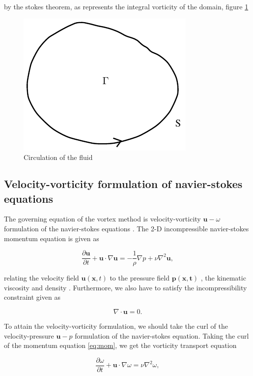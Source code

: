 by the stokes theorem, as represents the integral vorticity of the domain, figure \ref{fig:vorticityCirculation}

\begin{figure}[h]
\centering
\includegraphics[width=0.2\linewidth]{./figures/lagrangian/vorticityCirculation.pdf}
\caption{Circulation of the fluid}
\label{fig:vorticityCirculation}
\end{figure}

 
\subsection{Velocity-vorticity formulation of navier-stokes equations}
The governing equation of the vortex method is velocity-vorticity $\mathbf{u}-\omega$ formulation of the navier-stokes equations \cite{Cottet2000a}. The 2-D incompressible navier-stokes momentum equation is given as

\begin{equation}
\frac{\partial \mathbf{u}}{\partial t} + \mathbf{u}\cdot\nabla\mathbf{u} = - \frac{1}{\rho} \nabla p + \nu \nabla^2\mathbf{u},
\label{eq:mom}
\end{equation}

relating the velocity field $\mathbf{u}\left(\mathbf{x},t\right)$ to the pressure field $\mathbf{p\left(\mathbf{x},t\right)}$ , the kinematic viscosity  and density . Furthermore, we also have to satisfy the incompressibility constraint given as

\begin{equation}
\nabla\cdot\mathbf{u} = 0.
\end{equation}

To attain the velocity-vorticity formulation, we should take the curl of the velocity-pressure $\mathbf{u}-p$ formulation of the navier-stokes equation. Taking the curl of the momentum equation \ref{eq:mom}, we get the vorticity transport equation

\begin{equation}
\frac{\partial \omega}{\partial t} + \mathbf{u}\cdot\nabla\omega = \nu \nabla^2 \omega,
\end{equation}

